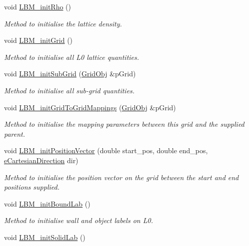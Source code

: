\begin{DoxyCompactItemize}
void \hyperlink{class_grid_obj_aac0e8a3fe74c69b3308ef3e19100f95c}{L\+B\+M\+\_\+init\+Rho} ()
\begin{DoxyCompactList}\small\item\em Method to initialise the lattice density. \end{DoxyCompactList}\item 
void \hyperlink{class_grid_obj_aeea74cc13001620abec1ba819233f714}{L\+B\+M\+\_\+init\+Grid} ()
\begin{DoxyCompactList}\small\item\em Method to initialise all L0 lattice quantities. \end{DoxyCompactList}\item 
void \hyperlink{class_grid_obj_a697f4d7fc6c9ed18e609528847b1e175}{L\+B\+M\+\_\+init\+Sub\+Grid} (\hyperlink{class_grid_obj}{Grid\+Obj} \&p\+Grid)
\begin{DoxyCompactList}\small\item\em Method to initialise all sub-\/grid quantities. \end{DoxyCompactList}\item 
void \hyperlink{class_grid_obj_a7a4c2d4eb5bc8f312d0998a55b38f0e2}{L\+B\+M\+\_\+init\+Grid\+To\+Grid\+Mappings} (\hyperlink{class_grid_obj}{Grid\+Obj} \&p\+Grid)
\begin{DoxyCompactList}\small\item\em Method to initialise the mapping parameters between this grid and the supplied parent. \end{DoxyCompactList}\item 
void \hyperlink{class_grid_obj_a32da287cacc2cbd15c3cee482ea4b010}{L\+B\+M\+\_\+init\+Position\+Vector} (double start\+\_\+pos, double end\+\_\+pos, \hyperlink{_enumerations_8h_afbad8e4a2f1e9903755b1bd2fe8273cf}{e\+Cartesian\+Direction} dir)
\begin{DoxyCompactList}\small\item\em Method to initialise the position vector on the grid between the start and end positions supplied. \end{DoxyCompactList}\item 
void \hyperlink{class_grid_obj_a4b6edceeda49496365e725eb67931961}{L\+B\+M\+\_\+init\+Bound\+Lab} ()
\begin{DoxyCompactList}\small\item\em Method to initialise wall and object labels on L0. \end{DoxyCompactList}\item 
void \hyperlink{class_grid_obj_a5dd08730d7cdea576bb4b337786a9bcf}{L\+B\+M\+\_\+init\+Solid\+Lab} ()

\end{DoxyCompactItemize}
